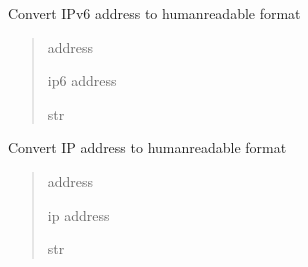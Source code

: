 \documentclass[letterpaper,10pt,english]{sphinxmanual}
\begin{document}
\begin{fulllineitems}
\label{\detokenize{modules/addres_conv:addres_conv.ip6_addr}}
\pysigstartsignatures
\pysiglinewithargsret
{}
{}
{}
\pysigstopsignatures
\sphinxAtStartPar
Convert IPv6 address to human\sphinxhyphen{}readable format
\begin{quote}\begin{description}
\sphinxAtStartPar
{} \textendash{} address

\sphinxAtStartPar
ip6 address

\sphinxAtStartPar
str

\end{description}\end{quote}

\end{fulllineitems}


\begin{fulllineitems}
\label{\detokenize{modules/addres_conv:addres_conv.ip_addr}}
\pysigstartsignatures
\pysiglinewithargsret
{}
{}
{}
\pysigstopsignatures
\sphinxAtStartPar
Convert IP address to human\sphinxhyphen{}readable format
\begin{quote}\begin{description}
\sphinxAtStartPar
{} \textendash{} address

\sphinxAtStartPar
ip address

\sphinxAtStartPar
str

\end{description}\end{quote}

\end{fulllineitems}

\end{document}
